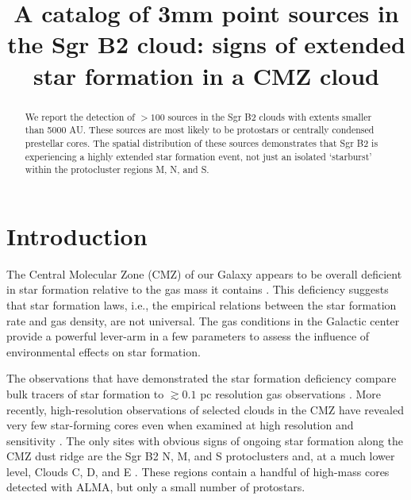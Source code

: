 \documentclass{emulateapj}
\begin{document}
\title{A catalog of 3mm point sources in the Sgr B2 cloud: signs of extended star formation in a CMZ cloud}

\begin{abstract}
We report the detection of $>100$ sources in the Sgr B2 clouds with extents
smaller than 5000 AU.  These sources are most likely to be protostars or
centrally condensed prestellar cores.  The spatial distribution of these sources
demonstrates that Sgr B2 is experiencing a highly extended star formation
event, not just an isolated `starburst' within the protocluster regions M, N,
and S.
\end{abstract}

\ifpdf
\maketitle
\fi

\section{Introduction}
The Central Molecular Zone (CMZ) of our Galaxy appears to be overall deficient
in star formation relative to the gas mass it contains \citep{Longmore2013a,
Kauffmann2016a,Kauffmann2016b,Barnes2016c,Barnes2017b}.  This deficiency
suggests that star formation laws, i.e., the empirical relations between
the star formation rate and gas density, are not universal.  The gas
conditions in the Galactic center provide a powerful lever-arm in a few
parameters \citep[e.g., pressure, temperature, velocity
dispersion][]{Ginsburg2016a,Immer2016a,Shetty2012a,Henshaw2016a} to assess the
influence of environmental effects on star formation.

The observations that have demonstrated the star formation deficiency compare
bulk tracers of star formation to $\gtrsim0.1$ pc resolution gas observations
\citep[e.g.]{Barnes2017b}.  More recently, high-resolution observations
of selected clouds in the CMZ have revealed very few star-forming cores
even when examined at high resolution and sensitivity
\citep{Rathborne2015a,Kauffmann2016a,Kauffmann2016b}.  The only sites with
obvious signs of ongoing star formation along the CMZ dust ridge are
the Sgr B2 N, M, and S protoclusters \citep{Schmiedeke2016a} and, at a much
lower level, Clouds C, D, and E \citep[][Walker et al, in prep; Barnes et al,
in prep]{Ginsburg2015b}.  These regions contain a handful of high-mass cores
detected with ALMA, but only a small number of protostars.
\end{document}
